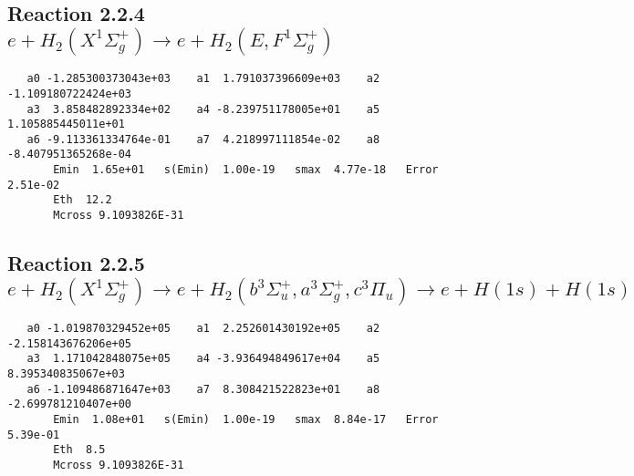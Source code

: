 \documentclass[12pt,dvipdfm]{article}
\begin{document}
\newpage
\subsection{
Reaction 2.2.4 $e + H_2(X^1\Sigma_g^+) \rightarrow e + H_2(E,F^1\Sigma_g^+)$}














\begin{small}\begin{verbatim}
   a0 -1.285300373043e+03    a1  1.791037396609e+03    a2 -1.109180722424e+03
   a3  3.858482892334e+02    a4 -8.239751178005e+01    a5  1.105885445011e+01
   a6 -9.113361334764e-01    a7  4.218997111854e-02    a8 -8.407951365268e-04
       Emin  1.65e+01   s(Emin)  1.00e-19   smax  4.77e-18   Error  2.51e-02
       Eth  12.2
       Mcross 9.1093826E-31
\end{verbatim}\end{small}




\newpage
\subsection{
Reaction 2.2.5 $e + H_2(X^1\Sigma_g^+) \rightarrow e + H_2(b^3\Sigma_u^+, a^3\Sigma_g^+, c^3\Pi_u) \rightarrow e + H(1s) + H(1s)$}






%








\begin{small}\begin{verbatim}
   a0 -1.019870329452e+05    a1  2.252601430192e+05    a2 -2.158143676206e+05
   a3  1.171042848075e+05    a4 -3.936494849617e+04    a5  8.395340835067e+03
   a6 -1.109486871647e+03    a7  8.308421522823e+01    a8 -2.699781210407e+00
       Emin  1.08e+01   s(Emin)  1.00e-19   smax  8.84e-17   Error  5.39e-01
       Eth  8.5
       Mcross 9.1093826E-31
\end{verbatim}\end{small}
\end{document}

